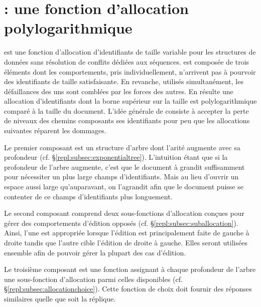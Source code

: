 
\section{\LSEQ : une fonction d'allocation polylogarithmique}
\label{repl:sec:lseq}

\LSEQ est une fonction d'allocation d'identifiants de taille variable pour les
structures de données sans résolution de conflits dédiées aux séquences. \LSEQ
est composée de trois éléments dont les comportements, pris individuellement,
n'arrivent pas à pourvoir des identifiants de taille satisfaisante. En revanche,
utilisés simultanément, les défaillances des uns sont comblées par les forces
des autres. En résulte une allocation d'identifiants dont la borne supérieur sur
la taille est polylogarithmique comparé à la taille du document. L'idée générale
de \LSEQ consiste à accepter la perte de niveaux des chemins composants ses
identifiants pour peu que les allocations suivantes réparent les dommages.

Le premier composant est un structure d'arbre dont l'arité augmente avec sa
profondeur (cf. §\ref{repl:subsec:exponentialtree}). L'intuition étant que si la
profondeur de l'arbre augmente, c'est que le document à grandit suffisamment
pour nécessiter un plus large champs d'identifiants. Mais au lieu d'ouvrir un
espace aussi large qu'auparavant, on l'agrandit afin que le document puisse se
contenter de ce champs d'identifiants plus longuement.

Le second composant comprend deux sous-fonctions d'allocation conçues pour gérer
des comportements d'édition opposés (cf. §\ref{repl:subsec:suballocation}). Ainsi,
l'une est appropriée lorsque l'édition est principalement faite de gauche à
droite tandis que l'autre cible l'édition de droite à gauche. Elles seront
utilisées ensemble afin de pouvoir gérer la plupart des cas d'édition.

Le troisième composant est une fonction assignant à chaque profondeur de l'arbre
une sous-fonction d'allocation parmi celles disponibles
(cf. §\ref{repl:subsec:allocationchoice}). Cette fonction de choix doit fournir des
réponses similaires quelle que soit la réplique.

